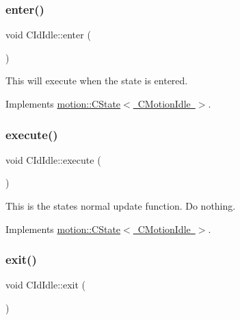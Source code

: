 \subsubsection{\texorpdfstring{enter()}{enter()}}
{\footnotesize\ttfamily void C\+Id\+Idle\+::enter (\begin{DoxyParamCaption}\item[{\mbox{\hyperlink{classmotion_1_1CMotionIdle}{C\+Motion\+Idle}} $\ast$}]{ }\end{DoxyParamCaption})\hspace{0.3cm}{\ttfamily [virtual]}}

This will execute when the state is entered. 

Implements \mbox{\hyperlink{classmotion_1_1CState_a53d5fcfec223b58ccdd364a8430fd23c}{motion\+::\+C\+State$<$ C\+Motion\+Idle $>$}}.

\mbox{\label{classmotion_1_1CIdIdle_a157fe57e41c2a53bb5bbd444a74636bd}} 
\subsubsection{\texorpdfstring{execute()}{execute()}}
{\footnotesize\ttfamily void C\+Id\+Idle\+::execute (\begin{DoxyParamCaption}\item[{\mbox{\hyperlink{classmotion_1_1CMotionIdle}{C\+Motion\+Idle}} $\ast$}]{ }\end{DoxyParamCaption})\hspace{0.3cm}{\ttfamily [virtual]}}

This is the states normal update function. Do nothing. 

Implements \mbox{\hyperlink{classmotion_1_1CState_a71dc72d345b15bf3b5b5bff596a71f33}{motion\+::\+C\+State$<$ C\+Motion\+Idle $>$}}.

\mbox{\label{classmotion_1_1CIdIdle_aa54a27090c4f10a9a2c5130d9baf14a3}} 
\subsubsection{\texorpdfstring{exit()}{exit()}}
{\footnotesize\ttfamily void C\+Id\+Idle\+::exit (\begin{DoxyParamCaption}\item[{\mbox{\hyperlink{classmotion_1_1CMotionIdle}{C\+Motion\+Idle}} $\ast$}]{ }\end{DoxyParamCaption})\hspace{0.3cm}{\ttfamily [virtual]}}

